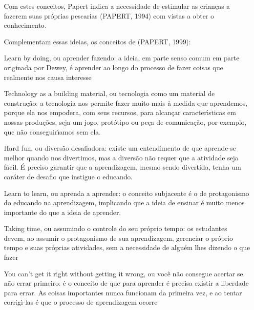 \documentclass[
12pt,		%
openright,	%
twoside,  %
a4paper,			%
chapter=TITLE,		%
english,			%
french,				%
spanish,			%
brazil				%
]{USPSC-classe/USPSC}
\begin{document}
Com estes conceitos, Papert indica a necessidade de estimular as crian\c{c}as a fazerem suas pr\'oprias pescarias  (PAPERT, 1994) com vistas a obter o conhecimento.










Complementam essas ideias, os conceitos de  (PAPERT, 1999):











\begin{alineas}
\item Learn by doing, ou aprender fazendo: a ideia, em parte senso comum em parte originada por Dewey, \'e aprender ao longo do processo de fazer coisas que realmente nos causa interesse
\item Technology as a building material, ou \textquotedbl tecnologia como um material de constru\c{c}\~ao\textquotedbl : a tecnologia nos permite fazer muito mais \`a medida que aprendemos, porque ela nos empodera, com seus recursos, para alcan\c{c}ar caracter\'{\i}sticas em nossas produ\c{c}\~oes, seja um jogo, prot\'otipo ou pe\c{c}a de comunica\c{c}\~ao, por exemplo, que n\~ao conseguir\'{\i}amos sem ela.
\item Hard fun, ou \textquotedbl divers\~ao desafiadora\textquotedbl : existe um entendimento de que aprende-se melhor quando nos divertimos, mas a divers\~ao n\~ao requer que a atividade seja f\'acil. \'E preciso garantir que a aprendizagem, mesmo sendo divertida, tenha um car\'ater de desafio que instigue o educando.
\item Learn to learn, ou \textquotedbl aprenda a aprender\textquotedbl : o conceito subjacente \'e o de protagonismo do educando na aprendizagem, implicando que a ideia de ensinar \'e muito menos importante do que a ideia de aprender.
\item Taking time, ou \textquotedbl assumindo o controle do seu pr\'oprio tempo\textquotedbl : os estudantes devem, ao assumir o protagonismo de sua aprendizagem, gerenciar o pr\'oprio tempo e suas pr\'oprias atividades, sem a necessidade de algu\'em lhes dizendo o que fazer
\item You can't get it right without getting it wrong, ou \textquotedbl voc\^e n\~ao consegue acertar se n\~ao errar primeiro\textquotedbl : \'e o conceito de que para aprender \'e precisa existir a liberdade para errar. As coisas importantes nunca funcionam da primeira vez, e ao tentar corrig\'{\i}-las \'e que o processo de aprendizagem ocorre

\end{alineas}
\end{document}
